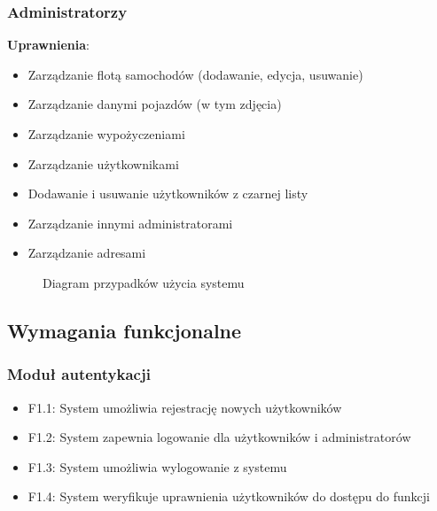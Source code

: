 \documentclass[12pt,a4paper]{article}
\begin{document}
\subsubsection{Administratorzy}
\textbf{Uprawnienia}:
\begin{itemize}
    \item Zarządzanie flotą samochodów (dodawanie, edycja, usuwanie)
    \item Zarządzanie danymi pojazdów (w tym zdjęcia)
    \item Zarządzanie wypożyczeniami
    \item Zarządzanie użytkownikami
    \item Dodawanie i usuwanie użytkowników z czarnej listy
    \item Zarządzanie innymi administratorami
    \item Zarządzanie adresami
\end{itemize}

\begin{figure}[H]
    \centering
    
    \caption{Diagram przypadków użycia systemu}
    \label{fig:use-case-diagram}
\end{figure}

\newpage

\subsection{Wymagania funkcjonalne}

\subsubsection{Moduł autentykacji}
\begin{itemize}
    \item F1.1: System umożliwia rejestrację nowych użytkowników
    \item F1.2: System zapewnia logowanie dla użytkowników i administratorów
    \item F1.3: System umożliwia wylogowanie z systemu
    \item F1.4: System weryfikuje uprawnienia użytkowników do dostępu do funkcji
\end{itemize}
\end{document}
